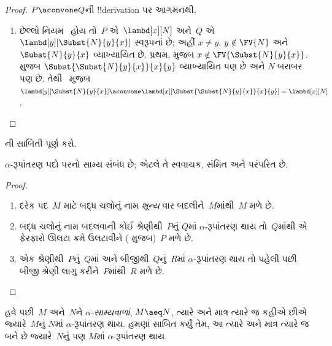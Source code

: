 \documentclass[../../../include/open-logic-section]{subfiles}
\begin{document}
\begin{proof}
  $P \aconvone Q$ની !!{derivation} પર આગમનથી.
  \begin{enumerate}
  \item છેલ્લો નિયમ~ હોય તો~$P$
    એ~$\lambd[x][N]$ અને~$Q$ એ
    $\lambd[y][\Subst{N}{y}{x}]$ સ્વરૂપનાં છે; અહીં
    $x \neq y$, $y \notin \FV{N}$ અને~$\Subst{N}{y}{x}$
    વ્યાખ્યાયિત છે. પ્રથમ,  મુજબ
    $x \notin
    \FV{\Subst{N}{y}{x}}$.  મુજબ
    $\Subst{\Subst{N}{y}{x}}{x}{y}$ વ્યાખ્યાયિત પણ છે અને
    $N$ બરાબર પણ છે. તેથી~ મુજબ
    $\lambd[y][\Subst{N}{y}{x}]
    \aconvone \lambd[x][\Subst{\Subst{N}{y}{x}}{x}{y}] =
    \lambd[x][N]$.
  \end{enumerate}
\end{proof}

\begin{prob}
  ની સાબિતી પૂર્ણ કરો.
\end{prob}

\begin{thm}
  $\alpha$-રૂપાંતરણ પદો પરનો સામ્ય સંબંધ છે; એટલે તે
  સ્વવાચક, સંમિત અને પરંપરિત છે.
\end{thm}

\begin{proof}
  \begin{enumerate}
  \item દરેક પદ~$M$ માટે બદ્ધ ચલોનું નામ \emph{શૂન્ય} વાર
    બદલીને~$M$માંથી~$M$ મળે છે.
  \item બદ્ધ ચલોનું નામ બદલવાની કોઈ શ્રેણીથી~$P$નું
    $Q$માં $\alpha$-રૂપાંતરણ થાય તો~$Q$માંથી એ ફેરફારો
    ઊલટા ક્રમે ઉલટાવીને ( મુજબ)~$P$ મળે છે.
  \item એક શ્રેણીથી~$P$નું~$Q$માં અને બીજીથી~$Q$નું~$R$માં
    $\alpha$-રૂપાંતરણ થાય તો પહેલી પછી બીજી શ્રેણી
    લાગુ કરીને~$P$માંથી~$R$ મળે છે.
  \end{enumerate}
\end{proof}

હવે પછી~$M$ અને~$N$ને \emph{$\alpha$-સામ્યવાળાં},
$M
\aeq N$, ત્યારે અને માત્ર ત્યારે જ કહીએ છીએ જ્યારે~$M$નું
$N$માં $\alpha$-રૂપાંતરણ થાય. હમણાં સાબિત કર્યું તેમ,
આ ત્યારે અને માત્ર ત્યારે જ બને છે જ્યારે~$N$નું પણ
$M$માં $\alpha$-રૂપાંતરણ થાય.
\end{document}
